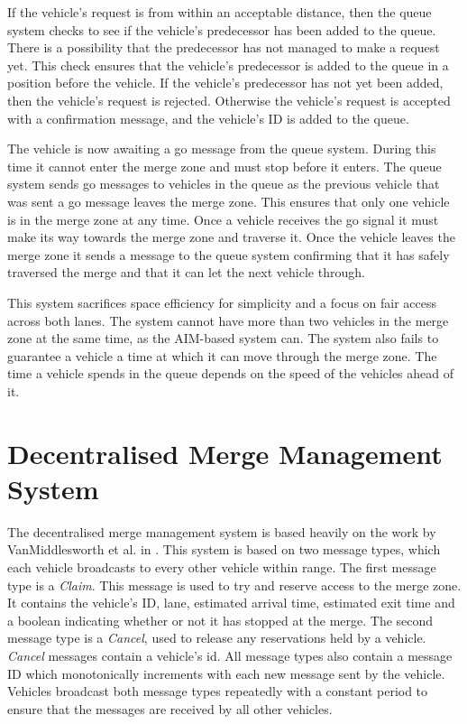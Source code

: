 If the vehicle's request is from within an acceptable distance, then the queue system checks to see if the vehicle's predecessor has been added to the queue. There is a possibility that the predecessor has not managed to make a request yet. This check ensures that the vehicle's predecessor is added to the queue in a position before the vehicle. If the vehicle's predecessor has not yet been added, then the vehicle's request is rejected. Otherwise the vehicle's request is accepted with a confirmation message, and the vehicle's ID is added to the queue.

The vehicle is now awaiting a go message from the queue system. During this time it cannot enter the merge zone and must stop before it enters. The queue system sends go messages to vehicles in the queue as the previous vehicle that was sent a go message leaves the merge zone. This ensures that only one vehicle is in the merge zone at any time. Once a vehicle receives the go signal it must make its way towards the merge zone and traverse it. Once the vehicle leaves the merge zone it sends a message to the queue system confirming that it has safely traversed the merge and that it can let the next vehicle through.

This system sacrifices space efficiency for simplicity and a focus on fair access across both lanes. The system cannot have more than two vehicles in the merge zone at the same time, as the AIM-based system can. The system also fails to guarantee a vehicle a time at which it can move through the merge zone. The time a vehicle spends in the queue depends on the speed of the vehicles ahead of it.

\section{Decentralised Merge Management System}
\label{sec:Decentralised Merge Management System}
The decentralised merge management system is based heavily on the work by VanMiddlesworth et al. in  \citep{VanMiddlesworth2008}. This system is based on two message types, which each vehicle broadcasts to every other vehicle within range. The first message type is a \emph{Claim}. This message is used to try and reserve access to the merge zone. It contains the vehicle's ID, lane, estimated arrival time, estimated exit time and a boolean indicating whether or not it has stopped at the merge. The second message type is a \emph{Cancel}, used to release any reservations held by a vehicle. \emph{Cancel} messages contain a vehicle's id. All message types also contain a message ID which monotonically increments with each new message sent by the vehicle. Vehicles broadcast both message types repeatedly with a constant period to ensure that the messages are received by all other vehicles. 

